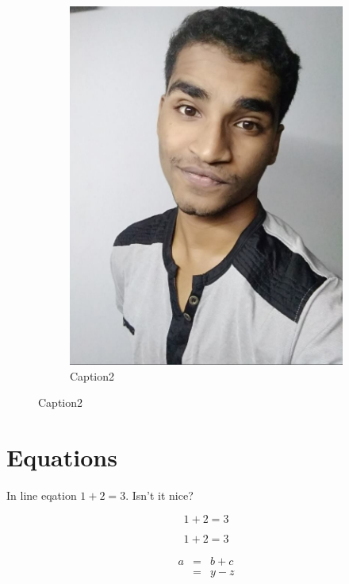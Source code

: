 \documentclass[a4paper, 12pt]{report}
\begin{document}
\begin{figure}[h]
\begin{subfigure}{0.4\textwidth}
\includegraphics[width=\textwidth]{jakir_hasan}
\caption{Caption2}
\label{fig:subimage2}
\end{subfigure}

\end{figure}

\newpage

\section{Equations}

In line eqation $ 1 + 2 = 3 $. Isn't it nice?

$$ 1 + 2 = 3 $$

\begin{equation}
1 + 2 = 3
\end{equation}

\begin{eqnarray*}
	a  & = & b + c\\
  	    & = & y - z
\end{eqnarray*}
\end{document}
